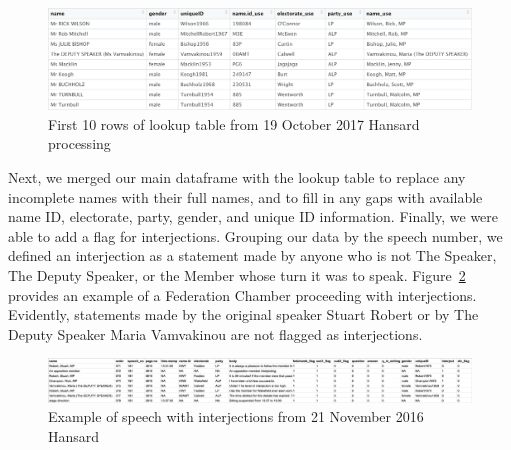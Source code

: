 \documentclass[
  letterpaper,
  DIV=11,
  numbers=noendperiod]{scrartcl}
\begin{document}
\begin{figure}

{\centering \includegraphics[width=4.66667in,height=\textheight]{images/lookup_ex.png}

}

\caption{\label{fig-lookup}First 10 rows of lookup table from 19 October
2017 Hansard processing}

\end{figure}

Next, we merged our main dataframe with the lookup table to replace any
incomplete names with their full names, and to fill in any gaps with
available name ID, electorate, party, gender, and unique ID information.
Finally, we were able to add a flag for interjections. Grouping our data
by the speech number, we defined an interjection as a statement made by
anyone who is not The Speaker, The Deputy Speaker, or the Member whose
turn it was to speak. Figure~\ref{fig-interject} provides an example of
a Federation Chamber proceeding with interjections. Evidently,
statements made by the original speaker Stuart Robert or by The Deputy
Speaker Maria Vamvakinou are not flagged as interjections.

\begin{figure}

{\centering \includegraphics{images/interject_ex.png}

}

\caption{\label{fig-interject}Example of speech with interjections from
21 November 2016 Hansard}

\end{figure}
\end{document}
